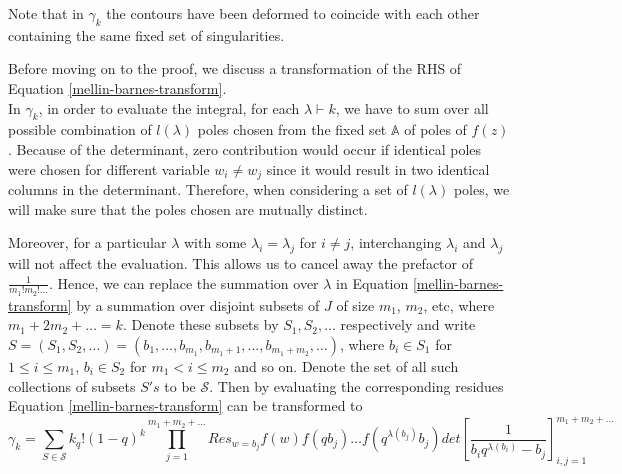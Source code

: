 \begin{remark}
Note that in $\gamma_k$ the contours have been deformed to coincide with each other containing the same fixed set of singularities. 
\end{remark}

Before moving on to the proof, we discuss a transformation of the RHS of Equation \ref{mellin-barnes-transform}. \\
In $\gamma_k$, in order to evaluate the integral, for each $\lambda \vdash k$, we have to sum over all possible combination of $l(\lambda)$ poles chosen from the fixed set $\mathbb{A}$ of poles of $f(z)$. Because of the determinant, zero contribution would occur if identical poles were chosen for different variable $w_i \neq w_j$ since it would result in two identical columns in the determinant. Therefore, when considering a set of $l(\lambda)$ poles, we will make sure that the poles chosen are mutually distinct.

Moreover, for a particular $\lambda$ with some $\lambda_i = \lambda_j$ for $i \neq j$, interchanging $\lambda_i$ and $\lambda_j$ will not affect the evaluation. This allows us to cancel away the prefactor of $\frac{1}{m_1! m_2! \dots}$. Hence, we can replace the summation over $\lambda$ in Equation \ref{mellin-barnes-transform} by a summation over disjoint subsets of $\mathit{J}$ of size $m_1$, $m_2$, etc, where $m_1 + 2m_2 + \dots = k$. Denote these subsets by $S_1, S_2, \dots$ respectively and write $S = (S_1, S_2, \dots ) = (b_1, \dots, b_{m_1}, b_{m_1+1}, \dots, b_{m_1 + m_2}, \dots)$, where $b_i \in S_1$ for $1 \le i \le m_1$, $b_i \in S_2$ for $m_1 < i \le m_2$ and so on. Denote the set of all such collections of subsets $S's$ to be $\mathcal{S}$. Then by evaluating the corresponding residues Equation \ref{mellin-barnes-transform} can be transformed to
\begin{equation}
\gamma_k = \sum_{S \in \mathcal{S}} k_q! (1-q)^k \prod_{j=1}^{m_1+m_2+\dots} Res_{w=b_j} f(w) f(qb_j) \dots f(q^{\lambda(b_j)} b_j) det\left[ \frac{1}{b_iq^{\lambda(b_i)} - b_j} \right]_{i,j=1}^{m_1+m_2+\dots}
\end{equation}

